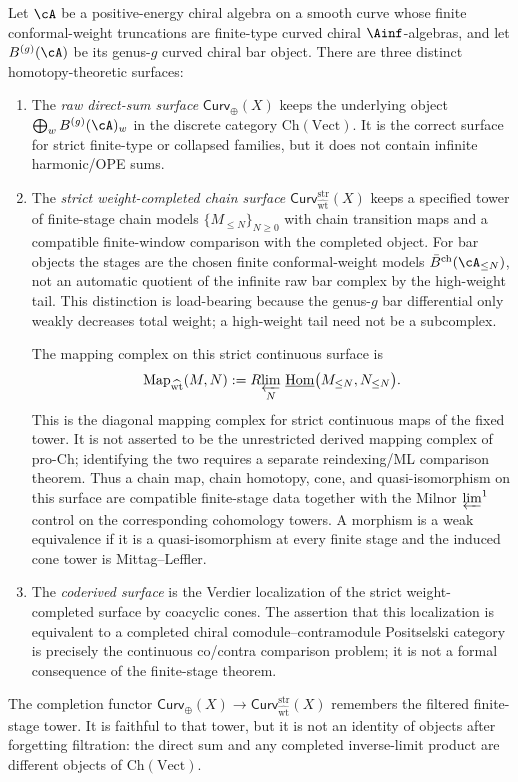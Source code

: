 \begin{definition}
\label{def:three-curved-chain-surfaces}
Let $\cA$ be a positive-energy chiral algebra on a smooth curve whose
finite conformal-weight truncations are finite-type curved chiral
$\Ainf$-algebras, and let $B^{(g)}(\cA)$ be its genus-$g$ curved
chiral bar object.
There are three distinct homotopy-theoretic surfaces:
\begin{enumerate}[label=\textup{(\arabic*)}]
\item The \emph{raw direct-sum surface}
$\mathsf{Curv}_{\oplus}(X)$ keeps the underlying object
$\bigoplus_w B^{(g)}(\cA)_w$ in the discrete category
$\mathrm{Ch}(\mathrm{Vect})$. It is the correct surface for strict
finite-type or collapsed families, but it does not contain infinite
harmonic/OPE sums.
\item The \emph{strict weight-completed chain surface}
$\mathsf{Curv}_{\widehat{\mathrm{wt}}}^{\mathrm{str}}(X)$ keeps a
specified tower of finite-stage chain models
$\{M_{\leq N}\}_{N\geq 0}$ with chain transition maps and a compatible
finite-window comparison with the completed object. For bar objects
the stages are the chosen finite conformal-weight models
$\bar B^{\mathrm{ch}}(\cA_{\leq N})$, not an automatic quotient of the
infinite raw bar complex by the high-weight tail. This distinction is
load-bearing because the genus-$g$ bar differential only weakly
decreases total weight; a high-weight tail need not be a subcomplex.

The mapping complex on this strict continuous surface is
\[
\mathrm{Map}_{\widehat{\mathrm{wt}}}(M,N)
:=
R\!\varprojlim_N\,
\underline{\mathrm{Hom}}\bigl(M_{\leq N},N_{\leq N}\bigr).
\]
This is the diagonal mapping complex for strict continuous maps of
the fixed tower. It is not asserted to be the unrestricted derived
mapping complex of $\mathrm{pro}\text{-}\mathrm{Ch}$; identifying the
two requires a separate reindexing/ML comparison theorem. Thus a
chain map, chain homotopy, cone, and quasi-isomorphism on this surface
are compatible finite-stage data together with the Milnor
$\varprojlim^1$ control on the corresponding cohomology towers. A
morphism is a weak equivalence if it is a quasi-isomorphism at every
finite stage and the induced cone tower is Mittag--Leffler.
\item The \emph{coderived surface} is the Verdier localization of the
strict weight-completed surface by coacyclic cones. The assertion that
this localization is equivalent to a completed chiral
comodule--contramodule Positselski category is precisely the
continuous co/contra comparison problem; it is not a formal
consequence of the finite-stage theorem.
\end{enumerate}
The completion functor
$\mathsf{Curv}_{\oplus}(X)\to
\mathsf{Curv}_{\widehat{\mathrm{wt}}}^{\mathrm{str}}(X)$ remembers
the filtered finite-stage tower. It is faithful to that tower, but it
is not an identity of objects after forgetting filtration: the direct
sum and any completed inverse-limit product are different objects of
$\mathrm{Ch}(\mathrm{Vect})$.
\end{definition}

